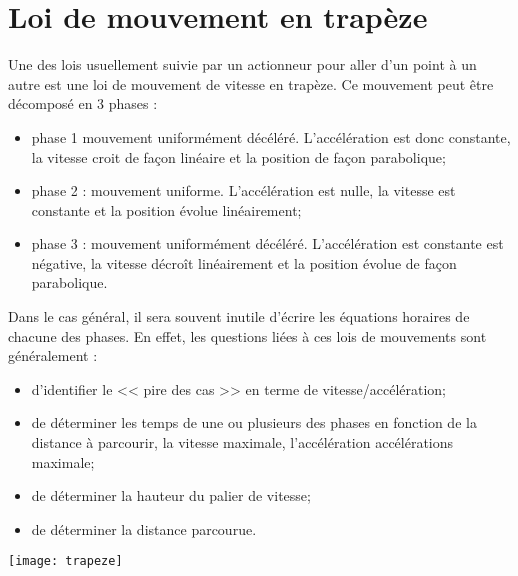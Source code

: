 



\section{Loi de mouvement en trapèze}
\noindent
\begin{minipage}[c]{.48\linewidth}
Une des lois usuellement suivie par un actionneur pour aller d'un point à un autre est une loi de mouvement de vitesse en trapèze.  Ce mouvement peut être décomposé en 3 phases : 
\begin{itemize}
\item phase 1 mouvement uniformément décéléré. L'accélération est donc constante, la vitesse croit de façon linéaire et la position de façon parabolique;
\item phase 2 : mouvement uniforme. L'accélération est nulle, la vitesse est constante et la position évolue linéairement;
\item phase 3 : mouvement uniformément décéléré. L'accélération est constante est négative, la vitesse décroît linéairement et la position évolue de façon parabolique. 
\end{itemize}


Dans le cas général, il sera souvent inutile d'écrire les équations horaires de chacune des phases. En effet, les questions liées à ces lois de mouvements sont généralement :
\begin{itemize}
\item d'identifier le << pire des cas >> en terme de vitesse/accélération;
\item de déterminer les temps de une ou plusieurs des phases en fonction de la distance à parcourir, la vitesse maximale, l'accélération accélérations maximale;
\item de déterminer la hauteur du palier de vitesse;
\item de déterminer la distance parcourue. 
\end{itemize}
\end{minipage}\hfill
\begin{minipage}[c]{.48\linewidth}
\begin{center}
\texttt{[image: trapeze]}
\end{center}
\end{minipage}
